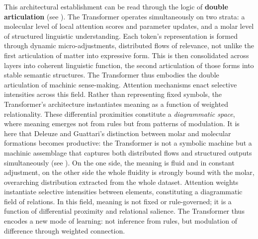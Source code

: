 \redsquare
This architectural establishment can be read through the logic of \textbf{double articulation} (see \cite{ai-inquiry2025a}). The Transformer operates simultaneously on two strata: a molecular level of local attention scores and parameter updates, and a molar level of structured linguistic understanding. Each \gls{token}’s representation is formed through dynamic micro-adjustments, distributed flows of relevance, not unlike the first articulation of matter into expressive form. This is then consolidated across layers into coherent linguistic function, the second articulation of those forms into stable semantic structures. The Transformer thus embodies the double articulation of machinic sense-making. Attention mechanisms enact selective intensities across this field. Rather than representing fixed symbols, the Transformer’s architecture instantiates meaning as a function of weighted relationality. These differential proximities constitute a \emph{diagrammatic space}, where meaning emerges not from rules but from patterns of modulation.  It is here that Deleuze and Guattari’s distinction between molar and molecular formations becomes productive: the Transformer is not a symbolic machine but a machinic assemblage that captures both distributed flows and structured outputs simultaneously (see \cite{ai-inquiry2025a}). On the one side, the meaning is fluid and in constant adjustment, on the other side the whole fluidity is strongly bound with the molar, overarching distribution extracted from the whole dataset. Attention weights instantiate selective intensities between elements, constituting a diagrammatic field of relations. In this field, meaning is not fixed or rule-governed; it is a function of differential proximity and relational salience. The Transformer thus encodes a new mode of learning: not inference from rules, but modulation of difference through weighted connection.








